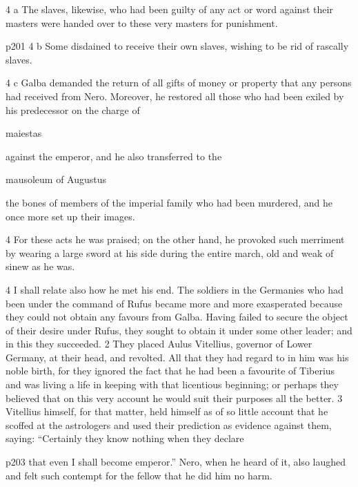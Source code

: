 4 a The slaves, likewise, who had been guilty of any act or word against their masters were handed over to these very masters for punishment.

p201
4 b Some disdained to receive their own slaves, wishing to be rid of rascally slaves.

4 c Galba demanded the return of all gifts of money or property that any persons had received from Nero. Moreover, he restored all those who had been exiled by his predecessor on the charge of

maiestas

against the emperor, and he also transferred to the

mausoleum of Augustus

the bones of members of the imperial family who had been murdered, and he once more set up their images.

4
For these acts he was praised; on the other hand, he provoked such merriment by wearing a large sword at his side during the entire march, old and weak of sinew as he was.

4 I shall relate also how he met his end. The soldiers in the Germanies who had been under the command of Rufus became more and more exasperated because they could not obtain any favours from Galba. Having failed to secure the object of their desire under Rufus, they sought to obtain it under some other leader; and in this they succeeded. 2 They placed Aulus Vitellius, governor of Lower Germany, at their head, and revolted. All that they had regard to in him was his noble birth, for they ignored the fact that he had been a favourite of Tiberius and was living a life in keeping with that licentious beginning; or perhaps they believed that on this very account he would suit their purposes all the better. 3 Vitellius himself, for that matter, held himself as of so little account that he scoffed at the astrologers and used their prediction as evidence against them, saying: ``Certainly they know nothing when they declare

p203 that even I shall become emperor.'' Nero, when he heard of it, also laughed and felt such contempt for the fellow that he did him no harm.

